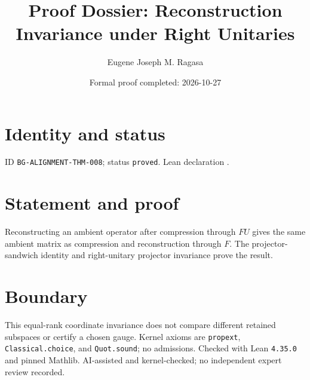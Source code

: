 \documentclass[11pt]{article}
\title{Proof Dossier: Reconstruction Invariance under Right Unitaries}\author{Eugene Joseph M. Ragasa}\date{Formal proof completed: 2026-10-27}
\begin{document}
\maketitle
\section{Identity and status}
ID \texttt{BG-ALIGNMENT-THM-008}; status \texttt{proved}. Lean declaration .
\section{Statement and proof}
Reconstructing an ambient operator after compression through $FU$ gives the same ambient matrix as compression and reconstruction through $F$. The projector-sandwich identity and right-unitary projector invariance prove the result.
\section{Boundary}
This equal-rank coordinate invariance does not compare different retained subspaces or certify a chosen gauge. Kernel axioms are \texttt{propext}, \texttt{Classical.choice}, and \texttt{Quot.sound}; no admissions. Checked with Lean \texttt{4.35.0} and pinned Mathlib. AI-assisted and kernel-checked; no independent expert review recorded.
\end{document}
